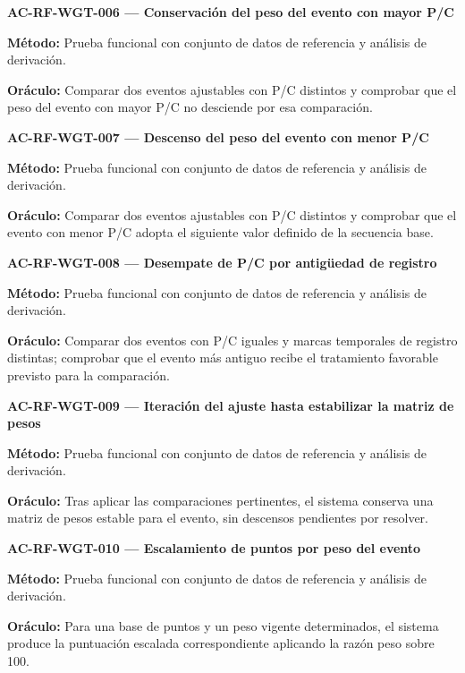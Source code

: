 \documentclass[10pt,letterpaper]{article}
\begin{document}
\noindent\textbf{AC-RF-WGT-006 --- Conservación del peso del evento con mayor P/C}\par
\textbf{Método:} Prueba funcional con conjunto de datos de referencia y análisis de derivación.\par
\textbf{Oráculo:} Comparar dos eventos ajustables con P/C distintos y comprobar que el peso del evento con mayor P/C no desciende por esa comparación.\par\vspace{0.45em}
\noindent\textbf{AC-RF-WGT-007 --- Descenso del peso del evento con menor P/C}\par
\textbf{Método:} Prueba funcional con conjunto de datos de referencia y análisis de derivación.\par
\textbf{Oráculo:} Comparar dos eventos ajustables con P/C distintos y comprobar que el evento con menor P/C adopta el siguiente valor definido de la secuencia base.\par\vspace{0.45em}
\noindent\textbf{AC-RF-WGT-008 --- Desempate de P/C por antigüedad de registro}\par
\textbf{Método:} Prueba funcional con conjunto de datos de referencia y análisis de derivación.\par
\textbf{Oráculo:} Comparar dos eventos con P/C iguales y marcas temporales de registro distintas; comprobar que el evento más antiguo recibe el tratamiento favorable previsto para la comparación.\par\vspace{0.45em}
\noindent\textbf{AC-RF-WGT-009 --- Iteración del ajuste hasta estabilizar la matriz de pesos}\par
\textbf{Método:} Prueba funcional con conjunto de datos de referencia y análisis de derivación.\par
\textbf{Oráculo:} Tras aplicar las comparaciones pertinentes, el sistema conserva una matriz de pesos estable para el evento, sin descensos pendientes por resolver.\par\vspace{0.45em}
\noindent\textbf{AC-RF-WGT-010 --- Escalamiento de puntos por peso del evento}\par
\textbf{Método:} Prueba funcional con conjunto de datos de referencia y análisis de derivación.\par
\textbf{Oráculo:} Para una base de puntos y un peso vigente determinados, el sistema produce la puntuación escalada correspondiente aplicando la razón peso sobre 100.\par\vspace{0.45em}
\end{document}
